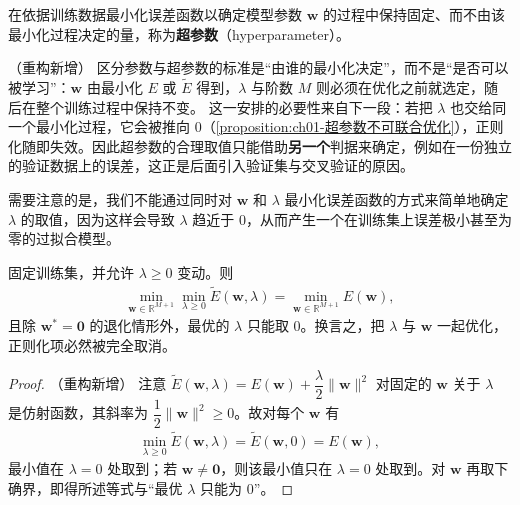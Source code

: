 \documentclass[../../main.tex]{subfiles}
\begin{document}
\begin{definition}[超参数]\label{definition:ch01-超参数}
在依据训练数据最小化误差函数以确定模型参数 $\mathbf{w}$ 的过程中保持固定、而不由该最小化过程决定的量，称为\textbf{超参数}（hyperparameter）。
\end{definition}

\begin{remark}（重构新增）
区分参数与超参数的标准是“由谁的最小化决定”，而不是“是否可以被学习”：$\mathbf{w}$ 由最小化 $E$ 或 $\tilde{E}$ 得到，$\lambda$ 与阶数 $M$ 则必须在优化之前就选定，随后在整个训练过程中保持不变。
这一安排的必要性来自下一段：若把 $\lambda$ 也交给同一个最小化过程，它会被推向 $0$（\cref{proposition:ch01-超参数不可联合优化}），正则化随即失效。因此超参数的合理取值只能借助\textbf{另一个}判据来确定，例如在一份独立的验证数据上的误差，这正是后面引入验证集与交叉验证的原因。
\end{remark}

需要注意的是，我们不能通过同时对 $\mathbf{w}$ 和 $\lambda$ 最小化误差函数的方式来简单地确定 $\lambda$ 的取值，因为这样会导致 $\lambda$ 趋近于 $0$，从而产生一个在训练集上误差极小甚至为零的过拟合模型。

\begin{proposition}[正则化系数不能与参数联合优化]\label{proposition:ch01-超参数不可联合优化}
固定训练集，并允许 $\lambda\geqslant 0$ 变动。则
\begin{align*}
  \min_{\mathbf{w}\in\mathbb{R}^{M+1}}\min_{\lambda\geqslant 0}\tilde{E}(\mathbf{w},\lambda)
  = \min_{\mathbf{w}\in\mathbb{R}^{M+1}}E(\mathbf{w}),
\end{align*}
且除 $\mathbf{w}^{*}=\mathbf{0}$ 的退化情形外，最优的 $\lambda$ 只能取 $0$。换言之，把 $\lambda$ 与 $\mathbf{w}$ 一起优化，正则化项必然被完全取消。
\end{proposition}

\begin{proof}（重构新增）
注意 $\tilde{E}(\mathbf{w},\lambda)=E(\mathbf{w})+\dfrac{\lambda}{2}\|\mathbf{w}\|^{2}$ 对固定的 $\mathbf{w}$ 关于 $\lambda$ 是仿射函数，其斜率为 $\dfrac{1}{2}\|\mathbf{w}\|^{2}\geqslant 0$。故对每个 $\mathbf{w}$ 有
\begin{align*}
  \min_{\lambda\geqslant 0}\tilde{E}(\mathbf{w},\lambda) = \tilde{E}(\mathbf{w},0) = E(\mathbf{w}),
\end{align*}
最小值在 $\lambda=0$ 处取到；若 $\mathbf{w}\neq\mathbf{0}$，则该最小值只在 $\lambda=0$ 处取到。对 $\mathbf{w}$ 再取下确界，即得所述等式与“最优 $\lambda$ 只能为 $0$”。
\end{proof}
\end{document}
